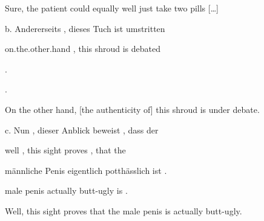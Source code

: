 \begin{styleMoutonExamplesTransAlpha}
Sure, the patient could equally well just take two pills […]
\end{styleMoutonExamplesTransAlpha}

\begin{styleMoutonExampleAlpha}
b.  Andererseits  ,  dieses  Tuch    ist  umstritten
\end{styleMoutonExampleAlpha}

\begin{styleMoutonExampleAlphaGloss}
on.the.other.hand  ,  this    shroud  is  debated
\end{styleMoutonExampleAlphaGloss}

\begin{styleMoutonExampleAlphaGloss}
.
\end{styleMoutonExampleAlphaGloss}

\begin{styleMoutonExampleAlphaGloss}
.
\end{styleMoutonExampleAlphaGloss}

\begin{styleMoutonExamplesTransAlpha}
On the other hand, [the authenticity of] this shroud is under debate.
\end{styleMoutonExamplesTransAlpha}

\begin{styleMoutonExampleAlpha}
c.  Nun  ,  dieser  Anblick  beweist  ,  dass  der
\end{styleMoutonExampleAlpha}

\begin{styleMoutonExampleAlphaGloss}
well  ,  this    sight    proves  ,  that  the
\end{styleMoutonExampleAlphaGloss}

\begin{styleMoutonExampleAlphaGloss}
männliche  Penis  eigentlich  potthässlich  ist  .
\end{styleMoutonExampleAlphaGloss}

\begin{styleMoutonExampleAlphaGloss}
male    penis  actually  butt-ugly    is  .
\end{styleMoutonExampleAlphaGloss}

\begin{styleMoutonExamplesTransAlpha}
Well, this sight proves that the male penis is actually butt-ugly.
\end{styleMoutonExamplesTransAlpha}

